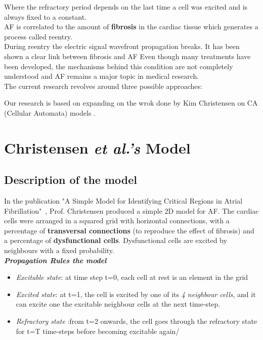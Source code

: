 \documentclass[twocolumn, a1paper, 12pt]{article}
\begin{document}
Where the refractory period depends on the last time a cell was excited and is always fixed to a constant.\\



AF is correlated to the amount of \textbf{ fibrosis} in the cardiac tissue which generates a process called reentry. \\
During reentry the electric signal wavefront propagation breaks. It has been shown a clear link between fibrosis and AF
Even though many treatments have been developed, the mechanisms behind this condition are not completely understood and AF remains a major topic in medical research. \\
The current research revolves around three possible approaches:


 
 Our research is based on expanding on the wrok done by Kim Christensen on CA (Cellular Automata) models \cite{Christensen}.




\section{\textbf{Christensen \emph{et al.'s} Model}}

\subsection{Description of the model}

In the publication "A Simple Model for Identifying Critical Regions in Atrial Fibrillation"~\cite{Christensen}, Prof. Christensen produced a simple 2D model for AF. The cardiac cells were arranged in a squared grid with horizontal connections, with a percentage of \textbf{ transversal connections} (to reproduce the effect of fibrosis) and a percentage of \textbf{dysfunctional cells}.
Dysfunctional cells are excited by neighbours with a fixed probability.\\

\textbf{\textit{Propagation Rules the model}}\\

\begin{itemize}
  \item \textit{Excitable state}: at time step t=0, each cell at rest is an element in the grid 

  										
  \item \textit{Excited state}: at t=1, the cell is excited by one of its \textit{ 4 neighbour cells}, and it can excite one the excitable neighbour cells at the next time-step.
  \item \textit{Refractory state} :from t=2 onwards, the cell goes through the refractory state for t=T time-steps before becoming excitable again/
\end{itemize}  
\end{document}
